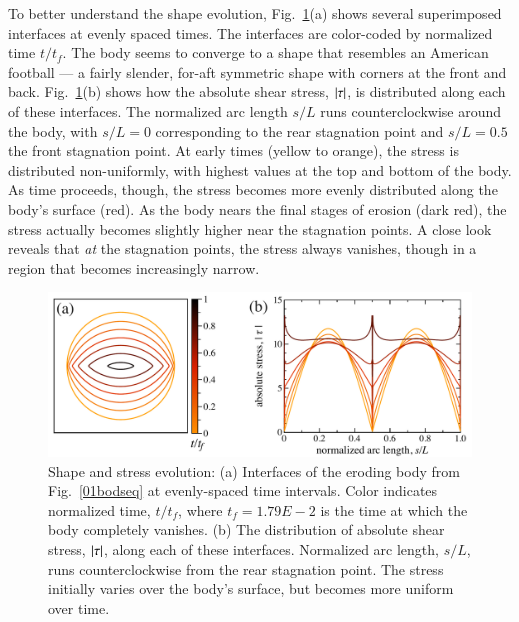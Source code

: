 \documentclass[preprint, 10pt]{elsarticle}
\begin{document}
To better understand the shape evolution, Fig.~\ref{shrink_intface}(a) shows several superimposed interfaces at evenly spaced times. The interfaces are color-coded by normalized time $t/t_f$. The body seems to converge to a shape that resembles an American football --- a fairly slender, for-aft symmetric shape with corners at the front and back.
Fig.~\ref{shrink_intface}(b) shows how the absolute shear stress, $\lvert \tau \rvert$, is distributed along each of these interfaces. The normalized arc length $s/L$ runs counterclockwise around the body, with $s/L = 0$ corresponding to the rear stagnation point and $s/L = 0.5$ the front stagnation point. At early times (yellow to orange), the stress is distributed non-uniformly, with highest values at the top and bottom of the body. As time proceeds, though, the stress becomes more evenly distributed along the body's surface (red). As the body nears the final stages of erosion (dark red), the stress actually becomes slightly higher near the stagnation points. A close look reveals that {\em at} the stagnation points, the stress always vanishes, though in a region that becomes increasingly narrow.

\begin{figure}%
\begin{center}
\includegraphics[width = 0.8 \textwidth]{./figs/shrink_intface.pdf}
\caption{
Shape and stress evolution: (a) Interfaces of the eroding body from Fig.~\ref{01bodseq} at evenly-spaced time intervals. Color indicates normalized time, $t/t_f$, where $t_f = 1.79E-2$ is the time at which the body completely vanishes. (b) The distribution of absolute shear stress, $\lvert \tau \rvert$, along each of these interfaces. Normalized arc length, $s/L$, runs counterclockwise from the rear stagnation point. The stress initially varies over the body's surface, but becomes more uniform over time.}
\label{shrink_intface}
\end{center}
\end{figure}
\end{document}
